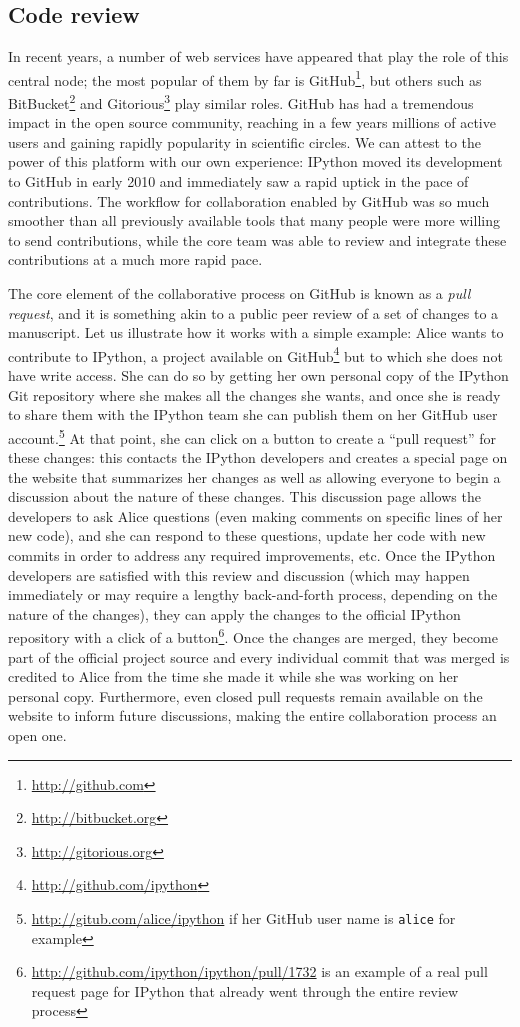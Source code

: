 \documentclass[ChapterTOCs,krantz2]{krantz} %
\begin{document}
\subsection{Code review}

In recent years, a number of web services have appeared that play the role of
this central node; the most popular of them by far is
GitHub\footnote{\url{http://github.com}}, but others such as
BitBucket\footnote{\url{http://bitbucket.org}} and
Gitorious\footnote{\url{http://gitorious.org}} play similar roles.  GitHub has
had a tremendous impact in the open source community, reaching in a few years
millions of active users and gaining rapidly popularity in scientific circles.
We can attest to the power of this platform with our own experience:
IPython moved its development to GitHub in early 2010 and
immediately saw a rapid uptick in the pace of contributions.  The workflow for
collaboration enabled by GitHub was so much smoother than all previously
available tools that many people were more willing to send contributions, while
the core team was able to review and integrate these contributions at a much
more rapid pace.

The core element of the collaborative process on GitHub is known as a
\emph{pull request}, and it is something akin to a public peer review of a set
of changes to a manuscript.  Let us illustrate how it works with a simple
example: Alice wants to contribute to IPython, a project available on
GitHub\footnote{\url{http://github.com/ipython}} but to which she does not have
write access. She can do so by getting her own personal copy of the IPython Git repository
where she makes all the changes she wants, and once she is ready to share them
with the IPython team she can publish them on her GitHub user account.\footnote{
\url{http://gitub.com/alice/ipython} if her GitHub user name is
\texttt{alice} for example}  At that point, she can click on
a button to create a ``pull request'' for these changes: this contacts the
IPython developers and creates a special page on the website that summarizes
her changes as well as allowing everyone to begin a discussion about the nature
of these changes.  This discussion page allows the developers to ask Alice
questions (even making comments on specific lines of her new code), and she can
respond to these questions, update her code with new commits in order to
address any required improvements, etc.  Once the IPython developers are
satisfied with this review and discussion (which may happen immediately or may
require a lengthy back-and-forth process, depending on the nature of the
changes), they can apply the changes to the official IPython repository with a
click of a button\footnote{\url{http://github.com/ipython/ipython/pull/1732} is an example of a real pull request page for IPython that already went through the entire review process}.  Once the changes are
merged, they become part of the official project source and every individual
commit that was merged is credited to Alice from the time she made it while she
was working on her personal copy.  Furthermore, even closed pull requests
remain available on the website to inform future discussions, making the entire
collaboration process an open one.
\end{document}
